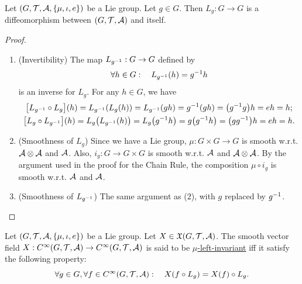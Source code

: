 \documentclass[11pt,reqno]{amsart}
\begin{document}
\begin{Thm}\label{thm:left-translation-diffeo}
Let $(G,\T,\A,\set{\mu,\iota,e})$ be a Lie group.
Let $g\in G$.
Then $L_g:G\to G$ is a diffeomorphism between $(G,\mathcal{T},\mathcal{A})$ and itself.
\end{Thm}
\begin{proof}
\begin{enumerate}
\item (Invertibility)
The map $L_{g^{-1}}:G\to G$ defined by
\[\forall h\in G:\quad L_{g^{-1}}(h)=g^{-1} h\]
is an inverse for $L_g$. For any $h\in G$, we have
\begin{gather*}
\FUNC{L_{g\inv}\circ L_g}{h}
=L_{g\inv}(L_g(h))
=L_{g\inv}(gh)
=g\inv(gh)
=\Br{g\inv g}h
=eh
=h;\\
\FUNC{L_g\circ L_{g\inv}}{h}
=L_g\Br{L_{g\inv}(h)}
=L_g\Br{g\inv h}
=g\Br{g\inv h}
=\Br{gg\inv}h
=eh
=h.
\end{gather*}
\item (Smoothness of $L_g$)
Since we have a Lie group,
$\mu:G\times G\to G$ is smooth w.r.t. $\mathcal{A}\otimes\mathcal{A}$ and $\mathcal{A}$.
Also, $i_g:G\to G\times G$ is smooth w.r.t.
$\mathcal{A}$ and $\mathcal{A}\otimes\mathcal{A}$.
By the argument used in the proof for the Chain Rule,
the composition $\mu\circ i_g$ is smooth w.r.t. $\mathcal{A}$ and $\mathcal{A}$.
\item (Smoothness of $L_{g^{-1}}$)
The same argument as (2), with $g$ replaced by $g^{-1}$.
\end{enumerate}
\end{proof}

\begin{Def}
Let $(G,\T,\A,\set{\mu,\iota,e})$ be a Lie group.
Let $X\in\mathfrak{X}(G,\mathcal{T},\mathcal{A})$.
The smooth vector field $X:C^\infty(G,\mathcal{T},\mathcal{A})\to C^\infty(G,\mathcal{T},\mathcal{A})$
is said to be \ul{$\mu$-left-invariant} iff it satisfy the following property:
\[\forall g\in G,\forall f\in C^\infty(G,\T,\A):\quad
X\Br{f\circ L_g}=X(f)\circ L_g.
\]
\end{Def}
\end{document}
